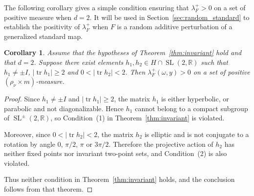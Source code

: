 \documentclass[a4paper,12pt,reqno]{amsart}
\numberwithin{equation}{section}
\newtheorem{corollary}[theorem]{Corollary}
\newcommand{\Rr}{{\mathbb{R}}}
\newcommand{\Tt}{{\mathbb{T}}}
\def\SL{\operatorname{SL}}
\def\tr{\operatorname{tr}}
\begin{document}
 


The following corollary gives a simple condition ensuring that $\lambda_F^{+}>0$ on a set of positive measure when $d=2$. It will be used in Section~\ref{sec:random_standard} to establish the positivity of $\lambda_F^{+}$ when $F$ is a random additive perturbation of a generalized standard map.

\begin{corollary}
\label{cor:simple}
Assume that the hypotheses of Theorem~\ref{thm:invariant} hold and that $d=2$. Suppose there exist elements $h_1, h_2 \in H \cap \SL(2,\Rr)$ such that $h_1 \neq \pm I$, $|\tr h_1| \ge 2$ and $0 < |\tr h_2| < 2$. 
Then $\lambda^+_F(\omega,y)>0$ on a set of positive $(\rho_\nu \times m)$-measure.
\end{corollary}

\begin{proof}
Since $h_1\neq \pm I$ and $|\operatorname{tr} h_1|\geq 2$, the matrix $h_1$
is either hyperbolic, or parabolic and not diagonalizable. Hence $h_1$ cannot belong to a compact subgroup of $\SL^{\pm}(2,\Rr)$, so Condition~\textup{(1)} in Theorem~\ref{thm:invariant} is violated.

Moreover, since $0<|\operatorname{tr} h_2|<2$, the matrix $h_2$ is elliptic and is not conjugate to a rotation by angle $0$, $\pi/2$, $\pi$ or $3\pi/2$. Therefore the projective action of $h_2$ has neither fixed points nor invariant two-point sets, and Condition~\textup{(2)} is also violated.

Thus neither condition in Theorem~\ref{thm:invariant} holds, and the conclusion follows from that theorem.
\end{proof}
\end{document}
